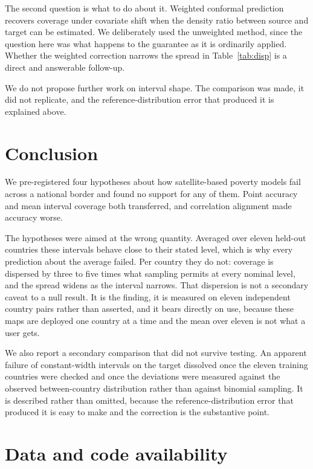 \documentclass[11pt]{article}
\begin{document}
The second question is what to do about it. Weighted conformal prediction
\citep{tibshirani2019} recovers coverage under covariate shift when the density
ratio between source and target can be estimated. We deliberately used the
unweighted method, since the question here was what happens to the guarantee as
it is ordinarily applied. Whether the weighted correction narrows the spread in
Table~\ref{tab:disp} is a direct and answerable follow-up.

We do not propose further work on interval shape. The comparison was made, it
did not replicate, and the reference-distribution error that produced it is
explained above.

\section{Conclusion}

We pre-registered four hypotheses about how satellite-based poverty models fail
across a national border and found no support for any of them. Point accuracy
and mean interval coverage both transferred, and correlation alignment made
accuracy worse.

The hypotheses were aimed at the wrong quantity. Averaged over eleven held-out
countries these intervals behave close to their stated level, which is why every
prediction about the average failed. Per country they do not: coverage is
dispersed by three to five times what sampling permits at every nominal level,
and the spread widens as the interval narrows. That dispersion is not a
secondary caveat to a null result. It is the finding, it is measured on eleven
independent country pairs rather than asserted, and it bears directly on use,
because these maps are deployed one country at a time and the mean over eleven
is not what a user gets.

We also report a secondary comparison that did not survive testing. An apparent
failure of constant-width intervals on the target dissolved once the eleven
training countries were checked and once the deviations were measured against
the observed between-country distribution rather than against binomial sampling.
It is described rather than omitted, because the reference-distribution error
that produced it is easy to make and the correction is the substantive point.

\section*{Data and code availability}
\end{document}
